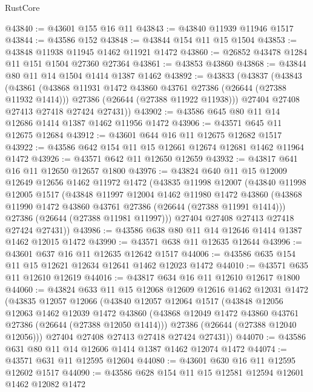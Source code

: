 \begin{lexlean}{RustCore}
\begin{coremodule}
@43840 := @43601 @155 @16 @11
@43843 := @43840 @11939 @11946 @1517
@43844 := @43586 @152
@43848 := @43844 @154 @11 @15 @1504
@43853 := @43848 @11938 @11945 @1462 @11921 @1472
@43860 := @26852 @43478 @1284 @11 @151 @1504 @27360 @27364
@43861 := @43853 @43860
@43868 := @43844 @80 @11 @14 @1504 @1414 @1387 @1462
@43892 := @43833
    (@43837
      (@43843
        (@43861
          (@43868 @11931 @1472 @43860 @43761 @27386 (@26644 (@27388 @11932 @1414)))
          @27386
          (@26644 (@27388 @11922 @11938)))
        @27404
        @27408
        @27413
        @27418
        @27424
        @27431))
@43902 := @43586 @645 @80 @11 @14 @12686 @1414 @1387 @1462 @11956 @1472
@43906 := @43571 @645 @11 @12675 @12684
@43912 := @43601 @644 @16 @11 @12675 @12682 @1517
@43922 := @43586 @642 @154 @11 @15 @12661 @12674 @12681 @1462 @11964 @1472
@43926 := @43571 @642 @11 @12650 @12659
@43932 := @43817 @641 @16 @11 @12650 @12657 @1800
@43976 := @43824
    @640
    @11
    @15
    @12009
    @12649
    @12656
    @1462
    @11972
    @1472
    (@43835
      @11998
      @12007
      (@43840
        @11998
        @12005
        @1517
        (@43848
          @11997
          @12004
          @1462
          @11980
          @1472
          @43860
          (@43868 @11990 @1472 @43860 @43761 @27386 (@26644 (@27388 @11991 @1414)))
          @27386
          (@26644 (@27388 @11981 @11997)))
        @27404
        @27408
        @27413
        @27418
        @27424
        @27431))
@43986 := @43586 @638 @80 @11 @14 @12646 @1414 @1387 @1462 @12015 @1472
@43990 := @43571 @638 @11 @12635 @12644
@43996 := @43601 @637 @16 @11 @12635 @12642 @1517
@44006 := @43586 @635 @154 @11 @15 @12621 @12634 @12641 @1462 @12023 @1472
@44010 := @43571 @635 @11 @12610 @12619
@44016 := @43817 @634 @16 @11 @12610 @12617 @1800
@44060 := @43824
    @633
    @11
    @15
    @12068
    @12609
    @12616
    @1462
    @12031
    @1472
    (@43835
      @12057
      @12066
      (@43840
        @12057
        @12064
        @1517
        (@43848
          @12056
          @12063
          @1462
          @12039
          @1472
          @43860
          (@43868 @12049 @1472 @43860 @43761 @27386 (@26644 (@27388 @12050 @1414)))
          @27386
          (@26644 (@27388 @12040 @12056)))
        @27404
        @27408
        @27413
        @27418
        @27424
        @27431))
@44070 := @43586 @631 @80 @11 @14 @12606 @1414 @1387 @1462 @12074 @1472
@44074 := @43571 @631 @11 @12595 @12604
@44080 := @43601 @630 @16 @11 @12595 @12602 @1517
@44090 := @43586 @628 @154 @11 @15 @12581 @12594 @12601 @1462 @12082 @1472

\end{coremodule}
\end{lexlean}
